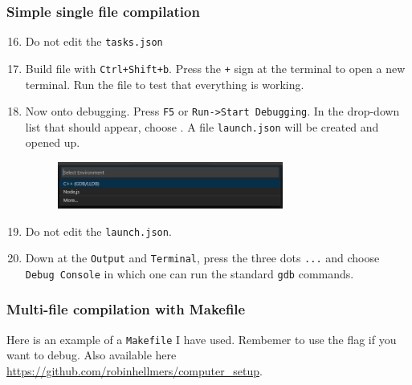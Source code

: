 \subsubsection{Simple single file compilation}

\begin{enumerate}
    \setcounter{enumi}{15}
    
    \item Do not edit the \texttt{tasks.json}
    
    \item Build file with \texttt{Ctrl+Shift+b}. Press the \texttt{+} sign at the terminal to open a new terminal. Run the file  to test that everything is working.
    
    \item Now onto debugging. Press \texttt{F5} or \texttt{Run->Start Debugging}. In the drop-down list that should appear, choose . A file \texttt{launch.json} will be created and opened up.
    
        \begin{figure}[H]
            \centering
            \includegraphics[width=0.7\textwidth]{Figures/WSL/vscode_environment_c++.PNG}
        \end{figure}
        
    \item Do not edit the \texttt{launch.json}.
    
    \item Down at the \texttt{Output} and \texttt{Terminal}, press the three dots \texttt{...} and choose \texttt{Debug Console} in which one can run the standard \texttt{gdb} commands.
    
\end{enumerate}

\subsubsection{Multi-file compilation with Makefile}

Here is an example of a \texttt{Makefile} I have used. Rembemer to use the  flag if you want to debug. Also available here \url{https://github.com/robinhellmers/computer_setup}.

